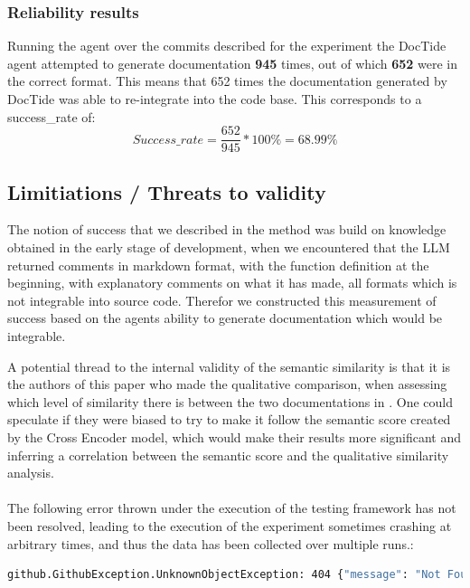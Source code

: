 \subsubsection{Reliability results}
\label{sec:suc_results}
Running the agent over the commits described for the experiment the DocTide agent attempted to generate documentation \textbf{945} times, out of which \textbf{652} were in the correct format. This means that 652 times the documentation generated by DocTide was able to re-integrate into the code base. This corresponds to a success\_rate of:
\[
Success\_rate=\frac{652}{945}*100\% = 68.99\%
\]

\subsection{Limitiations / Threats to validity}
The notion of success that we described in the method  was build on knowledge obtained in the early stage of development, when we encountered that the LLM returned comments in markdown format, with the function definition at the beginning, with explanatory comments on what it has made, all formats which is not integrable into source code. Therefor we constructed this measurement of success based on the agents ability to generate documentation which would be integrable.

A potential thread to the internal validity of the semantic similarity is that it is the authors of this paper who made the qualitative comparison, when assessing which level of similarity there is between the two documentations in . One could speculate if they were biased to try to make it follow the semantic score created by the Cross Encoder model, which would make their results more significant and inferring a correlation between the semantic score and the qualitative similarity analysis. 
\\ \\
The following error thrown under the execution of the testing framework has not been resolved, leading to the execution of the experiment sometimes crashing at arbitrary times, and thus the data has been collected over multiple runs.:
\begin{lstlisting}[language=bash, label={lst:unresolved_errors}, caption=Unresloved error ]
    github.GithubException.UnknownObjectException: 404 {"message": "Not Found", "documentation_url": "https://docs.github.com/rest/repos/contents#get-repository-content", "status": "404"}
\end{lstlisting}